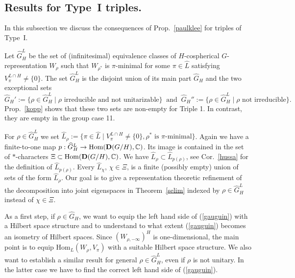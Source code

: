 \documentclass[10]{amsart}
\theoremstyle{remark}
\theoremstyle{definition}
\numberwithin{equation}{section}
\newcommand{\C}{\mathbb{C}}           %
\newcommand{\Hom}{\mathrm{Hom}}
\newcommand{\Cal}{\mathcal}
\begin{document}
{%

\subsection{Results for Type~I triples.}\label{TI} In this subsection we discuss the consequences of Prop.~\ref{paulklee} for triples of Type~I.

Let $\widehat G_H^L$ be the set of (infinitesimal) equivalence classes of $H$-cospherical $G$-representation $W_\rho$ such that $W_{\rho^*}$ is $\pi$-minimal for some $\pi\in \widehat L$ satisfying $V_\pi^{L\cap H}\ne\{0\}$. The set $\widehat G_H^L$ is the disjoint union of its main part $\widehat G_H$ and the two exceptional sets
$$  \widehat G_H':=\{\rho\in\widehat G_H^L\mid \rho\mbox{ irreducible and not unitarizable}\}\ \mbox{ and }\ 
\widehat G_H'':=\{\rho\in\widehat G_H^L\mid \rho\mbox{ not  irreducible}\}. $$ 
Prop.~\ref{kopp} shows that these two sets are non-empty for Triple 1. In contrast, they are empty in the group case 11.

For $\rho\in  \widehat G_H^L$ we set $\widehat L_\rho:=\{\pi\in\widehat L\mid V_\pi^{L\cap H}\ne\{0\},\rho^*\mbox{ is $\pi$-minimal}\}$. Again we have a finite-to-one map $p: \widehat G_H^L\rightarrow \Hom({\bf D}(G/H),\C)$. Its image is contained in the set of $*$-characters $\Xi\subset \Hom({\bf D}(G/H),\C)$. We have $\widehat L_\rho\subset \widehat L_{p(\rho)}$, see Cor.~\ref{hussa} for the definition of  $\widehat L_{p(\rho)}$. Every $\widehat L_\chi$, $\chi\in\Xi$, is a finite (possibly empty) union of sets of the form $\widehat L_\rho$. Our goal is to give a representation
theoretic refinement of the decomposition into joint eigenspaces in Theorem~\ref{selim} indexed by $\rho\in\widehat G_H^L$ instead of $\chi\in\Xi$.

As a first step, if $\rho\in\widehat G_H$, we want to equip the left hand side of (\ref{gauguin}) with a Hilbert space structure  and to understand to what extent (\ref{gauguin}) becomes an isometry of Hilbert spaces.
Since $(W_{\rho,-\infty})^H$ is one-dimensional, the main point is to equip $\Hom_L(W_{\rho},V_{\pi})$ with a suitable Hilbert space structure.
We also want to establish a similar result for general $\rho\in\widehat G_H^L$, even if $\rho$ is not unitary. In the latter case we have to find the correct left hand side of (\ref{gauguin}). 

}
\end{document}
